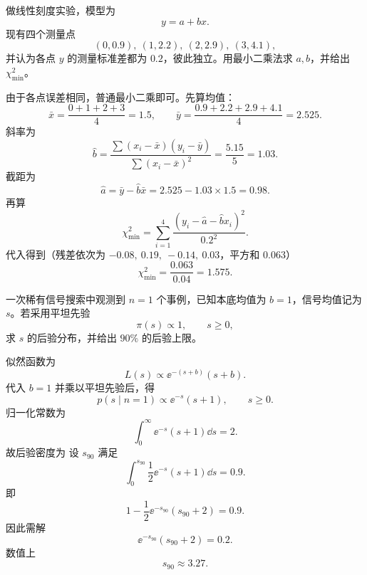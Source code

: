 \begin{question}
做线性刻度实验，模型为
\[
y=a+bx.
\]
现有四个测量点
\[
(0,0.9),\ (1,2.2),\ (2,2.9),\ (3,4.1),
\]
并认为各点 $y$ 的测量标准差都为 $0.2$，彼此独立。用最小二乘法求 $a,b$，并给出 $\chi^2_{\min}$。
\begin{solution}
由于各点误差相同，普通最小二乘即可。先算均值：
\[
\bar x=\frac{0+1+2+3}{4}=1.5,
\qquad
\bar y=\frac{0.9+2.2+2.9+4.1}{4}=2.525.
\]
斜率为
\[
\hat b=\frac{\sum (x_i-\bar x)(y_i-\bar y)}{\sum (x_i-\bar x)^2}
=\frac{5.15}{5}=1.03.
\]
截距为
\[
\hat a=\bar y-\hat b\bar x=2.525-1.03\times1.5=0.98.
\]
再算
\[
\chi^2_{\min}=\sum_{i=1}^4\frac{(y_i-\hat a-\hat b x_i)^2}{0.2^2}.
\]
代入得到（残差依次为 $-0.08,\ 0.19,\ -0.14,\ 0.03$，平方和 $0.063$）
\[
\chi^2_{\min}=\frac{0.063}{0.04}=1.575.
\]
\end{solution}
\end{question}

\begin{question}
一次稀有信号搜索中观测到 $n=1$ 个事例，已知本底均值为 $b=1$，信号均值记为 $s$。若采用平坦先验
\[
\pi(s)\propto 1,
\qquad s\ge 0,
\]
求 $s$ 的后验分布，并给出 $90\%$ 的后验上限。
\begin{solution}
似然函数为
\[
L(s)\propto \ee^{-(s+b)}(s+b).
\]
代入 $b=1$ 并乘以平坦先验后，得
\[
p(s\mid n=1)\propto \ee^{-s}(s+1),
\qquad s\ge 0.
\]
归一化常数为
\[
\int_0^{\infty} \ee^{-s}(s+1)\dd{s}=2.
\]
故后验密度为
设 $s_{90}$ 满足
\[
\int_0^{s_{90}}\frac12 \ee^{-s}(s+1)\dd{s}=0.9.
\]
即
\[
1-\frac12 \ee^{-s_{90}}(s_{90}+2)=0.9.
\]
因此需解
\[
\ee^{-s_{90}}(s_{90}+2)=0.2.
\]
数值上
\[
s_{90}\approx 3.27.
\]
\end{solution}
\end{question}

